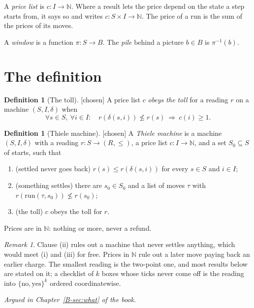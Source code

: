 \documentclass[11pt, a4paper]{article}
\theoremstyle{plain}
\theoremstyle{definition}
\newtheorem{definition}[theorem]{Definition}
\theoremstyle{remark}
\newtheorem{remark}[theorem]{Remark}
\newcommand{\N}{\mathbb{N}}
\newcommand{\step}{\delta}
\newcommand{\cost}{c}
\newcommand{\rd}{r}
\newcommand{\run}{\mathrm{run}}
\newcommand{\inv}{^{-1}}
\newcommand{\argued}[1]{\par\noindent\textit{Argued in Chapter~\ref{B-#1} of the book.}\par}
\newcommand{\kind}[1]{\textup{[#1]}}
\begin{document}
A \emph{price list} is $\cost:I\to\N$. Where a result lets the price depend on the state a step starts
from, it says so and writes $\cost:S\times I\to\N$. The price of a run is the sum of the prices of its
moves.

A \emph{window} is a function $\pi:S\to B$. The \emph{pile} behind a picture $b\in B$ is $\pi\inv(b)$.

\section{The definition}\label{spec:definition}

\begin{definition}[The toll]\label{def:toll} \kind{chosen}
A price list $\cost$ \emph{obeys the toll} for a reading $\rd$ on a machine $(S,I,\step)$ when
\[
\forall s\in S,\ \forall i\in I:\quad \rd(\step(s,i))\not\le\rd(s)\ \Longrightarrow\ \cost(i)\ge 1 .
\]
\end{definition}

\begin{definition}[Thiele machine]\label{def:thiele} \kind{chosen}
A \emph{Thiele machine} is a machine $(S,I,\step)$ with a reading $\rd:S\to(R,\le)$, a price list
$\cost:I\to\N$, and a set $S_0\subseteq S$ of starts, such that
\begin{enumerate}[label=(\roman*)]
\item (settled never goes back) $\rd(s)\le\rd(\step(s,i))$ for every $s\in S$ and $i\in I$;
\item (something settles) there are $s_0\in S_0$ and a list of moves $\tau$ with
$\rd(\run(\tau,s_0))\not\le\rd(s_0)$;
\item (the toll) $\cost$ obeys the toll for $\rd$.
\end{enumerate}
Prices are in $\N$: nothing or more, never a refund.
\end{definition}

\begin{remark}
Clause (ii) rules out a machine that never settles anything, which would meet (i) and (iii) for free.
Prices in $\N$ rule out a later move paying back an earlier charge. The smallest reading is the two-point
one, and most results below are stated on it; a checklist of $k$ boxes whose ticks never come off is the
reading into $\{\mathrm{no},\mathrm{yes}\}^k$ ordered coordinatewise.
\end{remark}

\argued{sec:what}
\end{document}
